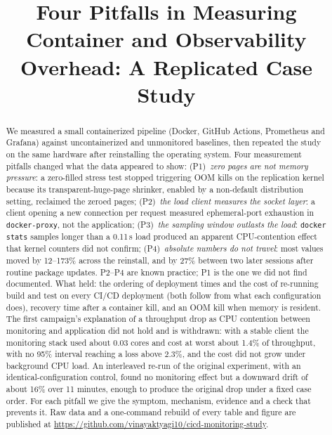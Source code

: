 \documentclass[conference]{IEEEtran}
\begin{document}
\title{Four Pitfalls in Measuring Container and Observability Overhead: A Replicated Case Study}

\author{
}

\maketitle

\begin{abstract}
We measured a small containerized pipeline (Docker, GitHub Actions, Prometheus and
Grafana) against uncontainerized and unmonitored baselines, then repeated the study on
the same hardware after reinstalling the operating system. Four measurement pitfalls
changed what the data appeared to show:
(P1)~\emph{zero pages are not memory pressure}: a zero-filled stress test stopped
triggering OOM kills on the replication kernel because its transparent-huge-page
shrinker, enabled by a non-default distribution setting, reclaimed the zeroed pages;
(P2)~\emph{the load client measures the socket layer}: a client opening a new connection
per request measured ephemeral-port exhaustion in \texttt{docker-proxy}, not the
application;
(P3)~\emph{the sampling window outlasts the load}: \texttt{docker stats} samples longer
than a 0.11\,s load produced an apparent CPU-contention effect that kernel counters did
not confirm;
(P4)~\emph{absolute numbers do not travel}: most values moved by 12--173\% across the
reinstall, and by 27\% between two later sessions after routine package updates.
P2--P4 are known practice; P1 is the one we did not find documented.
What held: the ordering of deployment times and the cost of re-running build and test on
every CI/CD deployment (both follow from what each configuration does),
recovery time after a container kill, and an OOM kill when memory
is resident. The first campaign's explanation of a throughput drop as CPU contention
between monitoring and application did not hold and is withdrawn: with a stable client
the monitoring stack used about 0.03 cores and cost at worst about 1.4\% of throughput,
with no 95\% interval reaching a loss above 2.3\%, and the cost did not grow under
background CPU load. An interleaved re-run of the
original experiment, with an identical-configuration control, found no monitoring effect
but a downward drift of about 16\% over 11 minutes, enough to produce the original drop
under a fixed case order. For each pitfall we give the symptom, mechanism, evidence
and a check that prevents it. Raw data and a one-command rebuild of every table and
figure are published at \url{https://github.com/vinayaktyagi10/cicd-monitoring-study}.
\end{abstract}
\end{document}
